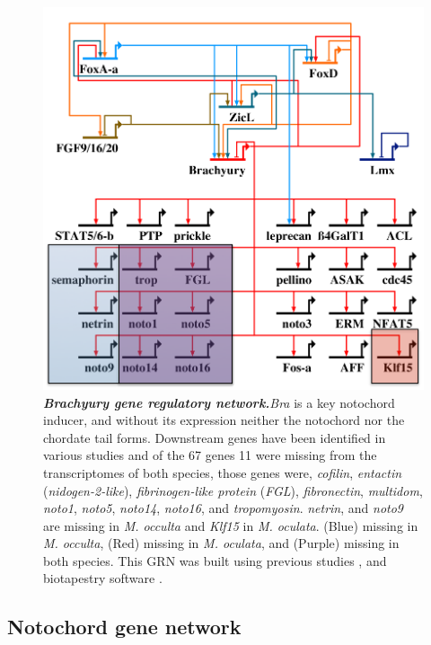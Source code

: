 \begin{figure}[tbp]
\centering
\includegraphics[scale=0.55]{figures/bra_grn.pdf}
\caption{\textbf{\textit{Brachyury gene regulatory network.}}\textit{Bra} is a key notochord inducer, and without its expression neither the notochord nor the chordate tail forms. Downstream genes have been identified in various studies and of the 67 genes 11 were missing from the transcriptomes of both species, those genes were, \textit{cofilin}, \textit{entactin} (\textit{nidogen-2-like}), \textit{fibrinogen-like protein} (\textit{FGL}), \textit{fibronectin}, \textit{multidom}, \textit{noto1}, \textit{noto5}, \textit{noto14}, \textit{noto16}, and \textit{tropomyosin}. \textit{netrin}, and \textit{noto9} are missing in \textit{M. occulta} and \textit{Klf15} in \textit{M. oculata}. (Blue) missing in \textit{M. occulta}, (Red) missing in \textit{M. oculata}, and (Purple) missing in both species. This GRN was built using previous studies  \cite{hotta_temporal_1999,hotta_characterization_2000,hotta_brachyury-downstream_2007,kugler_evolutionary_2008,kugler_evolutionary_2011}, and biotapestry software \cite{longabaugh_visualization_2009}.}
\label{fig:bra_grn}
\end{figure}
\subsection{Notochord gene network}

